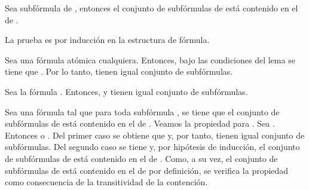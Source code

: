 \begin{isabellebody}
\begin{isamarkuptext}
  \begin{lema}
    Sea  subfórmula de , entonces el conjunto de subfórmulas de 
     está contenido en el de .
  \end{lema} 

  \begin{demostracion}
  La prueba es por inducción en la estructura de fórmula.
  
  Sea  una fórmula atómica cualquiera. Entonces, bajo las
  condiciones del lema se tiene que . Por lo tanto, tienen igual
  conjunto de subfórmulas.

  Sea la fórmula \isa{{\isasymbottom}}. Entonces,  y tienen igual conjunto de
  subfórmulas.

  Sea una fórmula  tal que para toda subfórmula , se tiene que el
  conjunto de subfórmulas de  está contenido en el de . Veamos la
  propiedad para . Sea . 
  Entonces  o . 
  Del primer caso se obtiene que  y, por tanto, tienen igual 
  conjunto de subfórmulas. Del segundo caso se tiene  y, 
  por hipótesis de inducción, el conjunto de subfórmulas de  está 
  contenido en el de . Como, a su vez, el conjunto de subfórmulas 
  de  está contenido en el de  por definición, se verifica la
  propiedad como consecuencia de la transitividad de la contención.


\end{demostracion}
\end{isamarkuptext}
\end{isabellebody}
